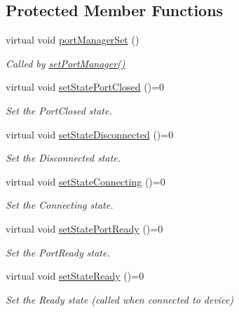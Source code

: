 \subsection*{Protected Member Functions}
\begin{DoxyCompactItemize}
\item 
virtual void \hyperlink{classmdt_abstract_port_setup_dialog_a3393de371465c1e278711b5b2fd8d2c2}{port\-Manager\-Set} ()
\begin{DoxyCompactList}\small\item\em Called by \hyperlink{classmdt_abstract_port_setup_dialog_a016ab988e47c7702a9400985eb95fbc5}{set\-Port\-Manager()} \end{DoxyCompactList}\item 
virtual void \hyperlink{classmdt_abstract_port_setup_dialog_a8df0ba3ef89cf29c9bc16c01e1aafc25}{set\-State\-Port\-Closed} ()=0
\begin{DoxyCompactList}\small\item\em Set the Port\-Closed state. \end{DoxyCompactList}\item 
virtual void \hyperlink{classmdt_abstract_port_setup_dialog_a6943bd9ed9fd9678c256b54c44d7227c}{set\-State\-Disconnected} ()=0
\begin{DoxyCompactList}\small\item\em Set the Disconnected state. \end{DoxyCompactList}\item 
virtual void \hyperlink{classmdt_abstract_port_setup_dialog_af0b938b1b8c3567c03feb02ba71307d4}{set\-State\-Connecting} ()=0
\begin{DoxyCompactList}\small\item\em Set the Connecting state. \end{DoxyCompactList}\item 
virtual void \hyperlink{classmdt_abstract_port_setup_dialog_a7a25a1b0377f60dad49856e7d04a1558}{set\-State\-Port\-Ready} ()=0
\begin{DoxyCompactList}\small\item\em Set the Port\-Ready state. \end{DoxyCompactList}\item 
virtual void \hyperlink{classmdt_abstract_port_setup_dialog_aac277958ac97ad7ad94135e0d152b732}{set\-State\-Ready} ()=0
\begin{DoxyCompactList}\small\item\em Set the Ready state (called when connected to device) \end{DoxyCompactList}\item 

\end{DoxyCompactItemize}

